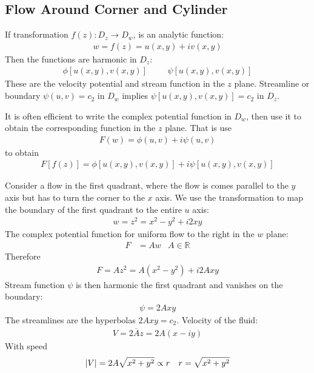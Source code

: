 \documentclass[12pt, english]{book}
\begin{document}
	\subsection{Flow Around Corner and Cylinder} \label{Flow Around Corner and Cylinder Subsection - Complex}
	
	If transformation \(f(z): D_z \rightarrow D_w\), is an analytic function:
	\begin{align*}
		w = f(z) = u(x,y) + iv(x,y)
	\end{align*}
	Then the functions are harmonic in \(D_z\):
	\begin{align*}
		\phi[u(x,y), v(x,y)] &&& \psi[u(x,y), v(x,y)]
	\end{align*}
	These are the velocity potential and stream function in the \(z\) plane. Streamline or boundary \(\psi(u,v) = c_2\) in \(D_w\) implies \(\psi[u(x,y), v(x,y)] = c_2\) in \(D_z\).
	
	It is often efficient to write the complex potential function in \(D_w\), then use it to obtain the corresponding function in the \(z\) plane. That is use
	\begin{align*}
		F(w) = \phi(u,v) + i\psi(u,v)
	\end{align*}
	to obtain
	\begin{align*}
		F[f(z)] = \phi[u(x,y), v(x,y)] + i \psi[u(x,y), v(x,y)]
	\end{align*}
	
	\begin{example}
		\label{Flow around a corner Example - Complex}
		\label{Flow! Around a corner}
		Consider a flow in the first quadrant, where the flow is comes parallel to the \(y\) axis but has to turn the corner to the \(x\) axis.
		We use the transformation to map the boundary of the first quadrant to the entire \(u\) axis:
		\begin{align*}
			w = z^2 = x^2 - y^2 + i2xy
		\end{align*}
		The complex potential function for uniform flow to the right in the \(w\) plane:
		\begin{align*}
			F &= Aw &
			A \in \mathbb{R}
		\end{align*}
		Therefore
		\begin{align*}
			F = Az^2 = A(x^2 - y^2) + i2Axy
		\end{align*}
		Stream function \(\psi\) is then harmonic the first quadrant and vanishes on the boundary:
		\begin{align*}
			\psi = 2Axy
		\end{align*}
		The streamlines are the hyperbolas \(2Axy = c_2\).
		Velocity of the fluid:
		\begin{align*}
			V = \overline{2Az} = 2A(x - iy)
		\end{align*}
		With speed
		\begin{align*}
			\abs{V} &= 2A \sqrt{x^2 + y^2} \propto r
				& r = \sqrt{x^2 + y^2}
		\end{align*}
	\end{example}
\end{document}
